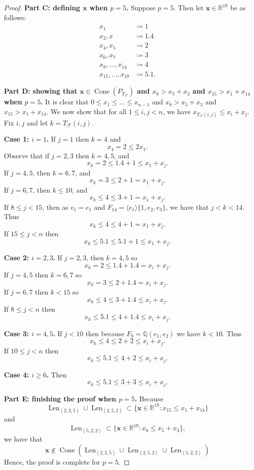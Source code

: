 \documentclass[letterpaper,10pt]{amsart}
\DeclareMathOperator{\Len}{Len}
\DeclareMathOperator{\Cone}{Cone}
\newcommand{\QQ}{\mathbb{Q}}      %
\newcommand{\RR}{\mathbb{R}}      %
\newcommand{\la}{\langle}
\newcommand{\ra}{\rangle}
\newcommand{\cF}{\mathcal{F}}
\theoremstyle{definition}
\theoremstyle{remark}
\begin{document}
\begin{proof}
\noindent \textbf{Part C: defining $\mathbf{x}$ when $p = 5$.}
Suppose $p=5$. Then let $\mathbf{x} \in \RR^{19}$ be as follows:
\begin{align*}
x_1 &\coloneqq 1 \\
x_2,x &\coloneqq 1.4 \\
x_4,x_5 &\coloneqq 2 \\
x_6,x_7 &\coloneqq 3 \\
x_8,\dots,x_{14} &\coloneqq 4 \\
x_{15},\dots,x_{19} &\coloneqq 5.1.
\end{align*}

\noindent \textbf{Part D: showing that $\mathbf{x} \in \Cone(P_{T_{\cF}})$ and $x_8 > x_5 + x_3$ and $x_{15} > x_1 + x_{14}$ when $p = 5$.}
It is clear that $0 \leq x_1 \leq \dots \leq x_{n-1}$ and $x_8 > x_5 + x_3$ and $x_{15} > x_1 + x_{14}$. We now show that for all $1\leq i,j < n$, we have $x_{T_{\cF}(i,j)} \leq x_i + x_j$. Fix $i,j$ and let $k = T_{\cF}(i,j)$.

\noindent \textbf{Case 1: $i = 1$.} If $j = 1$ then $k = 4$ and 
\[
	x_4 = 2 \leq 2x_1.
\]
Observe that if $j = 2,3$ then $k = 4,5$, and
\[
	x_k = 2 \leq 1.4 + 1 \leq x_1 + x_j.
\]
If $j = 4,5$, then $k = 6,7$, and 
\[
	x_k = 3 \leq 2 + 1 = x_1 + x_j.
\]
If $j = 6,7$, then $k \leq 10$, and
\[
	x_k \leq 4 \leq 3 + 1 = x_1 + x_j.
\]
If $8 \leq j < 15$, then as $v_1 = e_1$ and $F_{14} = \la e_1 \ra \{ 1, e_2, e_3 \}$, we have that $j < k < 14$. Thus
\[
	x_k \leq 4 \leq 4 + 1 = x_1 + x_j.
\] 
If $15\leq j < n$ then
\[
	x_k \leq 5.1 \leq 5.1 + 1 \leq x_1 + x_j.
\]

\noindent \textbf{Case 2: $i = 2,3$.}
If $j = 2,3$, then $k = 4,5$ so 
\[
	x_k = 2 \leq 1.4 + 1.4 = x_i + x_j.
\]
If $j = 4,5$ then $k = 6,7$ so
\[
	x_k = 3 \leq 2 + 1.4 = x_i + x_j.
\]
If $j = 6,7$ then $k < 15$ so
\[
	x_k \leq 4 \leq 3 + 1.4 \leq x_i + x_j.
\]
If $8 \leq j < n$ then
\[
	x_k \leq 5.1 \leq 4 + 1.4 \leq x_i + x_j.
\]

\noindent \textbf{Case 3: $i = 4,5$.}
If $j < 10$ then because $F_9 = \QQ( e_1,e_2 )$ we have $k < 10$. Thus
\[
	x_k \leq 4 \leq 2 + 2 \leq x_i + x_j. 
\]
If $10 \leq j < n$ then
\[
	x_k \leq 5.1 \leq 4 + 2 \leq x_i + x_j.
\]

\noindent \textbf{Case 4: $i \geq 6$.}
Then 
\[
	x_k \leq 5.1 \leq 3 + 3 \leq x_i + x_j.
\]

\noindent \textbf{Part E: finishing the proof when $p = 5$.}
Because 
\[
	\Len_{(2,2,5)} \cup \Len_{(2,5,2)} \subset \{\mathbf{x} \in \RR^{19} : x_{15} \leq x_1 + x_{14} \}
\]
and
\[
	\Len_{(5,2,2)} \subset \{\mathbf{x} \in \RR^{19} : x_8 \leq x_5 + x_3 \},
\]
we have that 
\[
	\mathbf{x} \notin \Cone(\Len_{(2,2,5)} \cup \Len_{(2,5,2)} \cup \Len_{(5,2,2)})
\]
Hence, the proof is complete for $p = 5$.


\end{proof}
\end{document}
